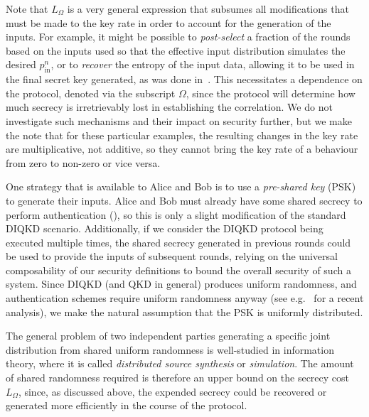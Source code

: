 \documentclass[10pt, a4paper]{article}
\numberwithin{equation}{section} %
\theoremstyle{definition}
\theoremstyle{plain}
\newcommand{\?}{\mathrel{?}} %
\newcommand{\prin}[1][p]{#1_{\mathrm{in}}}
\begin{document}
    Note that \(L_{\Omega}\) is a very general expression that subsumes all modifications that must be made to the key rate in order to account for the generation of the inputs. For example, it might be possible to \emph{post-select} a fraction of the rounds based on the inputs used so that the effective input distribution simulates the desired \(\prin^n\), or to \emph{recover} the entropy of the input data, allowing it to be used in the final secret key generated, as was done in~\cite[Prot. 2]{DIQKD_FiniteSize}. This necessitates a dependence on the protocol, denoted via the subscript \(\Omega\), since the protocol will determine how much secrecy is irretrievably lost in establishing the correlation. We do not investigate such mechanisms and their impact on security further, but we make the note that for these particular examples, the resulting changes in the key rate are multiplicative, not additive, so they cannot bring the key rate of a behaviour from zero to non-zero or vice versa.

    One strategy that is available to Alice and Bob is to use a \emph{pre-shared key} (PSK) to generate their inputs. Alice and Bob must already have some shared secrecy to perform authentication (), so this is only a slight modification of the standard DIQKD scenario. Additionally, if we consider the DIQKD protocol being executed multiple times, the shared secrecy generated in previous rounds could be used to provide the inputs of subsequent rounds, relying on the universal composability of our security definitions to bound the overall security of such a system. Since DIQKD (and QKD in general) produces uniform randomness, and authentication schemes require uniform randomness anyway (see e.g.~\cite{AuthKeyRecycling} for a recent analysis), we make the natural assumption that the PSK is uniformly distributed.

    The general problem of two independent parties generating a specific joint distribution from shared uniform randomness is well-studied in information theory, where it is called \emph{distributed source synthesis} or \emph{simulation}. The amount of shared randomness required is therefore an upper bound on the secrecy cost \(L_{\Omega}\), since, as discussed above, the expended secrecy could be recovered or generated more efficiently in the course of the protocol.
\end{document}
